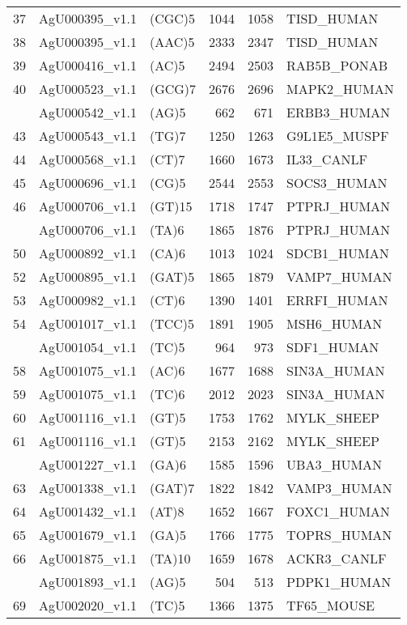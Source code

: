 \documentclass[]{article}
\begin{document}
\begin{longtable}[t]{lllrrl}
37 & AgU000395\_v1.1 & (CGC)5 & 1044 & 1058 & TISD\_HUMAN\\
38 & AgU000395\_v1.1 & (AAC)5 & 2333 & 2347 & TISD\_HUMAN\\
39 & AgU000416\_v1.1 & (AC)5 & 2494 & 2503 & RAB5B\_PONAB\\
40 & AgU000523\_v1.1 & (GCG)7 & 2676 & 2696 & MAPK2\_HUMAN\\
\addlinespace
42 & AgU000542\_v1.1 & (AG)5 & 662 & 671 & ERBB3\_HUMAN\\
43 & AgU000543\_v1.1 & (TG)7 & 1250 & 1263 & G9L1E5\_MUSPF\\
44 & AgU000568\_v1.1 & (CT)7 & 1660 & 1673 & IL33\_CANLF\\
45 & AgU000696\_v1.1 & (CG)5 & 2544 & 2553 & SOCS3\_HUMAN\\
46 & AgU000706\_v1.1 & (GT)15 & 1718 & 1747 & PTPRJ\_HUMAN\\
\addlinespace
48 & AgU000706\_v1.1 & (TA)6 & 1865 & 1876 & PTPRJ\_HUMAN\\
50 & AgU000892\_v1.1 & (CA)6 & 1013 & 1024 & SDCB1\_HUMAN\\
52 & AgU000895\_v1.1 & (GAT)5 & 1865 & 1879 & VAMP7\_HUMAN\\
53 & AgU000982\_v1.1 & (CT)6 & 1390 & 1401 & ERRFI\_HUMAN\\
54 & AgU001017\_v1.1 & (TCC)5 & 1891 & 1905 & MSH6\_HUMAN\\
\addlinespace
55 & AgU001054\_v1.1 & (TC)5 & 964 & 973 & SDF1\_HUMAN\\
58 & AgU001075\_v1.1 & (AC)6 & 1677 & 1688 & SIN3A\_HUMAN\\
59 & AgU001075\_v1.1 & (TC)6 & 2012 & 2023 & SIN3A\_HUMAN\\
60 & AgU001116\_v1.1 & (GT)5 & 1753 & 1762 & MYLK\_SHEEP\\
61 & AgU001116\_v1.1 & (GT)5 & 2153 & 2162 & MYLK\_SHEEP\\
\addlinespace
62 & AgU001227\_v1.1 & (GA)6 & 1585 & 1596 & UBA3\_HUMAN\\
63 & AgU001338\_v1.1 & (GAT)7 & 1822 & 1842 & VAMP3\_HUMAN\\
64 & AgU001432\_v1.1 & (AT)8 & 1652 & 1667 & FOXC1\_HUMAN\\
65 & AgU001679\_v1.1 & (GA)5 & 1766 & 1775 & TOPRS\_HUMAN\\
66 & AgU001875\_v1.1 & (TA)10 & 1659 & 1678 & ACKR3\_CANLF\\
\addlinespace
67 & AgU001893\_v1.1 & (AG)5 & 504 & 513 & PDPK1\_HUMAN\\
69 & AgU002020\_v1.1 & (TC)5 & 1366 & 1375 & TF65\_MOUSE\\

\end{longtable}
\end{document}
